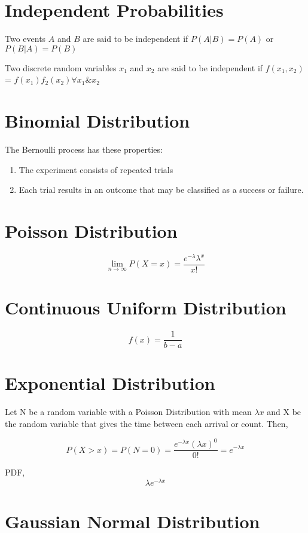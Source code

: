 \documentclass[11pt]{report}
\begin{document}
\section{Independent Probabilities}
\label{sec:org665993c}

Two events \(A\) and \(B\) are said to be independent if \(P(A|B) = P(A)\) or \(P(B|A) = P(B)\)

Two discrete random variables \(x_1\) and \(x_2\) are said to be independent if \(f(x_1,x_2)\) = \(f(x_1)f_2(x_2) \forall x_1 \& x_2\)
\section{Binomial Distribution}
\label{sec:org87842cd}
The Bernoulli process has these properties:
\begin{enumerate}
\item The experiment consists of repeated trials
\item Each trial results in an outcome that may be classified as a success or failure.
\end{enumerate}
\section{Poisson Distribution}
\label{sec:org7338e77}
$$\lim_{n \rightarrow \infty} P(X=x) = \frac{e^{-\lambda}\lambda^x}{x!}$$
\section{Continuous Uniform Distribution}
\label{sec:org2f0312b}
$$f(x) = \frac{1}{b-a}$$
\section{Exponential Distribution}
\label{sec:orgfc85264}
Let N be a random variable with a Poisson Distribution with mean \(\lambda x\) and X be the random variable that gives the time between each arrival or count. Then,


$$P(X > x) = P(N=0) = \frac{e^{-\lambda x}(\lambda x)^0}{0!} = e^{-\lambda x}$$

PDF,
$$\lambda e^{-\lambda x}$$
\section{Gaussian Normal Distribution}
\label{sec:org3cd3035}
\end{document}
